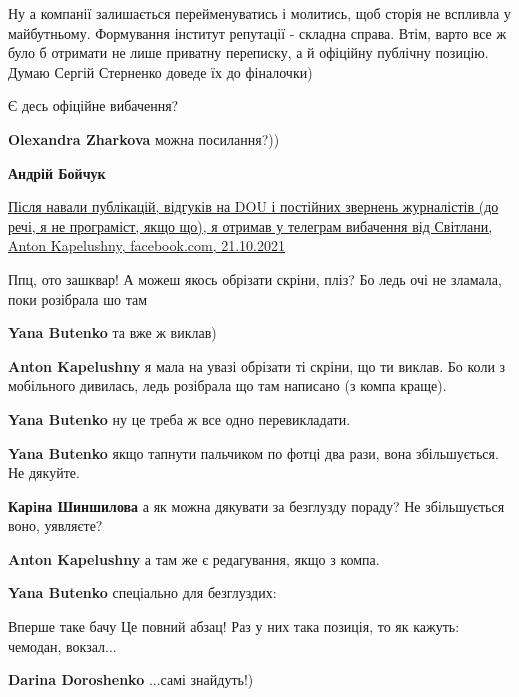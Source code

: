 \begin{itemize}
\begin{itemize}
Ну а компанії залишається перейменуватись і молитись, щоб сторія не вспливла у
майбутньому. Формування інститут репутації - складна справа. Втім, варто все ж
було б отримати не лише приватну переписку, а й офіційну публічну позицію.
Думаю Сергій Стерненко доведе їх до фіналочки)


Є десь офіційне вибачення?

\textbf{Olexandra Zharkova} можна посилання?))

\textbf{Андрій Бойчук} 

\href{https://www.facebook.com/1402747822/posts/10220450373435039/}{%
Після навали публікацій, відгуків на DOU і постійних звернень журналістів (до речі, я не програміст, якщо що), я отримав у телеграм вибачення від Світлани, Anton Kapelushny, facebook.com, 21.10.2021%
}

\end{itemize} %


Ппц, ото зашквар! А можеш якось обрізати скріни, пліз? Бо ледь очі не зламала,
поки розібрала шо там

\begin{itemize} %
\textbf{Yana Butenko} та вже ж виклав)

\textbf{Anton Kapelushny} я мала на увазі обрізати ті скріни, що ти виклав. Бо коли з мобільного дивилась, ледь розібрала що там написано (з компа краще).

\textbf{Yana Butenko} ну це треба ж все одно перевикладати.

\textbf{Yana Butenko} якщо тапнути пальчиком по фотці два рази, вона збільшується. Не дякуйте.

\textbf{Карiна Шиншилова} а як можна дякувати за безглузду пораду? Не збільшується воно, уявляєте?

\textbf{Anton Kapelushny} а там же є редагування, якщо з компа.

\textbf{Yana Butenko} спеціально для безглуздих:

Вперше таке бачу
Це повний абзац!
Раз у них така позиція, то як кажуть: чемодан, вокзал...

\textbf{Darina Doroshenko} ...самі знайдуть!)
\end{itemize} %


\end{itemize}
